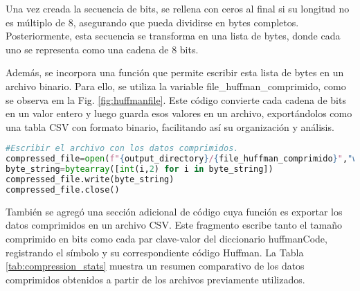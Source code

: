 \documentclass[conference,onecolumn,12pt]{IEEEtran}
\numberwithin{equation}{subsection}
\begin{document}
Una vez creada la secuencia de bits, se rellena con ceros al final si su longitud no es múltiplo de 8, asegurando que pueda dividirse en bytes completos. Posteriormente, esta secuencia se transforma en una lista de bytes, donde cada uno se representa como una cadena de 8 bits.

Además, se incorpora una función que permite escribir esta lista de bytes en un archivo binario. Para ello, se utiliza la variable file\_huffman\_comprimido, como se observa em la Fig. \ref{fig:huffmanfile}. Este código convierte cada cadena de bits en un valor entero y luego guarda esos valores en un archivo, exportándolos como una tabla CSV con formato binario, facilitando así su organización y análisis.


\begin{lstlisting}[language=Python, caption={Función de lista en archivo binario usando file\_huffman\_comprimido}, label={listing2}]
#Escribir el archivo con los datos comprimidos.
compressed_file=open(f"{output_directory}/{file_huffman_comprimido}","wb")
byte_string=bytearray([int(i,2) for i in byte_string])
compressed_file.write(byte_string)
compressed_file.close()
\end{lstlisting}

También se agregó una sección adicional de código cuya función es exportar los datos comprimidos en un archivo CSV. Este fragmento escribe tanto el tamaño comprimido en bits como cada par clave-valor del diccionario huffmanCode, registrando el símbolo y su correspondiente código Huffman. La Tabla \ref{tab:compression_stats}  muestra un resumen comparativo de los datos comprimidos obtenidos a partir de los archivos previamente utilizados.
\end{document}
